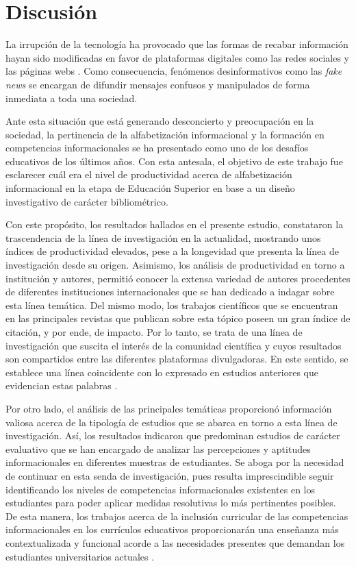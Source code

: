 \documentclass{textolivre}
\begin{document}
\section{Discusión}
La irrupción de la tecnología ha provocado que las formas de recabar información hayan sido modificadas en favor de  plataformas digitales como las redes sociales y las páginas webs \cite{alonsoelat2020}. %
Como consecuencia, fenómenos desinformativos como las \emph{fake news} se encargan de difundir mensajes confusos y manipulados de forma inmediata a toda una sociedad.

Ante esta situación que está generando desconcierto y preocupación en la sociedad, la pertinencia de la alfabetización informacional y la formación en competencias informacionales se ha presentado como uno de los desafíos educativos de los últimos años. Con esta antesala, el objetivo de este trabajo fue esclarecer cuál era el nivel de productividad acerca de alfabetización informacional en la etapa de Educación Superior en base a un diseño investigativo de carácter bibliométrico.

Con este propósito, los resultados hallados en el presente estudio, constataron la trascendencia de la línea de investigación en la actualidad, mostrando unos índices de productividad elevados, pese a la longevidad que presenta la línea de investigación desde su origen. Asimismo, los análisis de productividad en torno a institución y autores, permitió conocer la extensa variedad de autores procedentes de diferentes instituciones internacionales que se han dedicado a indagar sobre esta línea temática. Del mismo modo, los trabajos científicos que se encuentran en las principales revistas que publican sobre esta tópico poseen un gran índice de citación, y por ende, de impacto. Por lo tanto, se trata de una línea de investigación que suscita el interés de la comunidad científica y cuyos resultados son compartidos entre las diferentes plataformas divulgadoras. En este sentido, se establece una línea coincidente con lo expresado en estudios anteriores que evidencian estas palabras \cite{demeulemeesteretal2019, demeulemeester2018}. %

Por otro lado, el análisis de las principales temáticas proporcionó información valiosa acerca de la tipología de estudios que se abarca en torno a esta línea de investigación. Así, los resultados indicaron que predominan estudios de carácter evaluativo que se han encargado de analizar las percepciones y aptitudes informacionales en diferentes muestras de estudiantes. Se aboga por la necesidad de continuar en esta senda de investigación, pues resulta imprescindible seguir identificando los niveles de competencias informacionales existentes en los estudiantes para poder aplicar medidas resolutivas lo más pertinentes posibles. De esta manera, los trabajos acerca de la inclusión curricular de las competencias informacionales en los currículos educativos proporcionarán una enseñanza más contextualizada y funcional acorde a las necesidades presentes que demandan los estudiantes universitarios actuales \cite{ball2019, george2019}. %
\end{document}
